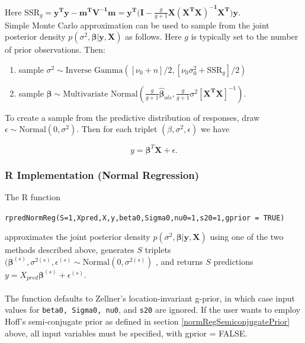 \documentclass[12pt, a4paper]{article}
\begin{document}
\noindent Here $\text{SSR}_g = \mathbf{y^Ty - m^TV^{-1}m = y^T(I - }\frac{g}{g+1}\mathbf{X(X^TX)^{-1}X^T)y}$.\\

Simple Monte Carlo approximation can be used to sample from the joint posterior density $p(\sigma^2,\boldsymbol\beta|\mathbf{y,X})$ as follows.  Here $g$ is typically set to the number of prior observations.  Then:

\begin{enumerate}
    \item sample $\sigma^2 \sim \text{Inverse Gamma}([\nu_0 + n]/2,[\nu_0\sigma^2_0 + \text{SSR}_g]/2)$
    \item sample $\boldsymbol\beta \sim \text{Multivariate Normal}\left(\frac{g}{g+1}\hat{\boldsymbol\beta}_{ols},\frac{g}{g+1}\sigma^2[\mathbf{X^TX}]^{-1}\right)$.
\end{enumerate}

\noindent To create a sample from the predictive distribution of responses, draw $\epsilon \sim \text{Normal}(0,\sigma^2)$.  Then for each triplet $(\beta,\sigma^2,\epsilon)$ we have

$$y = \boldsymbol\beta^T\mathbf{X} + \epsilon.$$

  \subsubsection{R Implementation (Normal Regression)}

The R function

\begin{center}\texttt{rpredNormReg(S=1,Xpred,X,y,beta0,Sigma0,nu0=1,s20=1,gprior = TRUE)}\end{center}

\noindent approximates the joint posterior density $p(\sigma^2,\boldsymbol\beta|\mathbf{y,X})$ using one of the two methods described above, generates $S$ triplets $(\boldsymbol\beta^{(s)}, \sigma^{2(s)},\epsilon^{(s)} \sim \text{Normal}(0,\sigma^{2(s)})$ , and returns $S$ predictions $y = X_{pred}\boldsymbol\beta^{(s)} + \epsilon^{(s)}$.\\\\

\noindent The function defaults to Zellner's location-invariant g-prior, in which case input values for \texttt{beta0, Sigma0, nu0}, and \texttt{s20} are ignored.  If the user wants to employ Hoff's semi-conjugate prior as defined in section \ref{normRegSemiconjugatePrior} above, all input variables must be specified, with gprior = FALSE.
\end{document}
